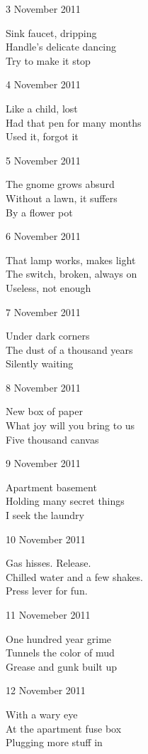 \documentclass[12pt]{article}
\begin{document}
\newpage

3 November 2011

Sink faucet, dripping \\
Handle's delicate dancing  \\
Try to make it stop

4 November 2011

Like a child, lost \\
Had that pen for many months \\
Used it, forgot it

5 November 2011

The gnome grows absurd \\
Without a lawn, it suffers \\
By a flower pot

6 November 2011

That lamp works, makes light \\
The switch, broken, always on \\
Useless, not enough

7 November 2011

Under dark corners \\
The dust of a thousand years \\
Silently waiting

8 November 2011

New box of paper \\
What joy will you bring to us \\
Five thousand canvas

9 November 2011

Apartment basement \\
Holding many secret things \\
I seek the laundry

\newpage

10 November 2011

Gas hisses. Release. \\
Chilled water and a few shakes. \\
Press lever for fun.

11 Novemeber 2011

One hundred year grime \\
Tunnels the color of mud \\
Grease and gunk built up

12 November 2011

With a wary eye \\
At the apartment fuse box \\
Plugging more stuff in
\end{document}
